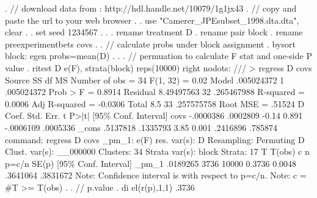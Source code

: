 . // download data from : http://hdl.handle.net/10079/1g1jx43
. // copy and paste the url to your web browser
. 
. use "Camerer_JPEsubset_1998.dta.dta", clear 
{\smallskip}
. 
. set seed 1234567
{\smallskip}
. 
. 
.         rename treatment D
{\smallskip}
.         rename pair block
{\smallskip}
.         rename preexperimentbets covs
{\smallskip}
. 
.         // calculate probs under block assignment
.         bysort block: egen probs=mean(D)
{\smallskip}
.         
.                 
.         // permuation to calculate F stat and one-side P value
.         ritest D e(F), strata(block) reps(10000) right nodots: ///
>         regress D covs
{\smallskip}
      Source {\VBAR}       SS           df       MS      Number of obs   =        34
   F(1, 32)        =      0.02
       Model {\VBAR}  .005024372         1  .005024372   Prob > F        =    0.8914
    Residual {\VBAR}  8.49497563        32  .265467988   R-squared       =    0.0006
   Adj R-squared   =   -0.0306
       Total {\VBAR}         8.5        33  .257575758   Root MSE        =    .51524
{\smallskip}
           D {\VBAR}      Coef.   Std. Err.      t    P>|t|     [95\% Conf. Interval]
        covs {\VBAR}  -.0000386   .0002809    -0.14   0.891    -.0006109    .0005336
       _cons {\VBAR}   .5137818   .1335793     3.85   0.001     .2416896     .785874
{\smallskip}
      command:  regress D covs
        _pm_1:  e(F)
  res. var(s):  D
   Resampling:  Permuting D
Clust. var(s):  __000000
     Clusters:  34
Strata var(s):  block
       Strata:  17
{\smallskip}
T            {\VBAR}     T(obs)       c       n   p=c/n   SE(p) [95\% Conf. Interval]
       _pm_1 {\VBAR}   .0189265    3736   10000  0.3736  0.0048  .3641064   .3831672
Note: Confidence interval is with respect to p=c/n.
Note: c = \#{\lbr}T >= T(obs){\rbr}
{\smallskip}
. 
.         // p.value
.         di el(r(p),1,1)
.3736
{\smallskip}
